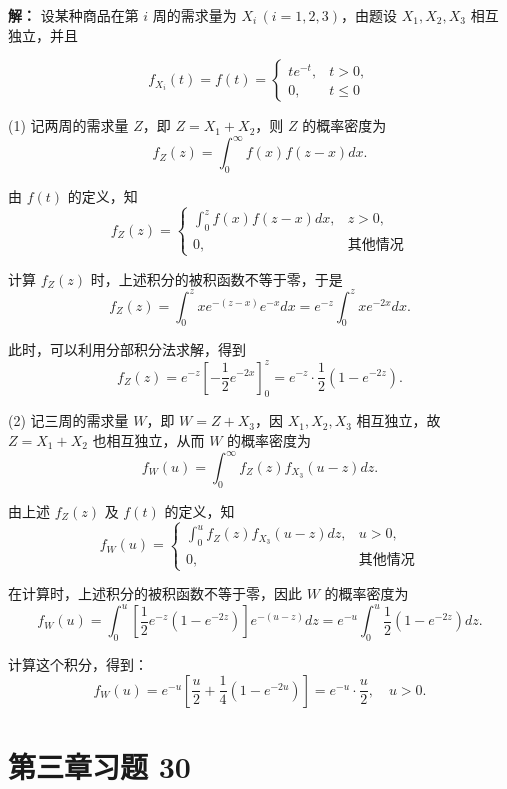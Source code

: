 \documentclass[twoside]{article}
\begin{document}
\begin{ans}{23}{23}
    \textbf{解：} 设某种商品在第 $i$ 周的需求量为 $X_i\,(i=1,2,3)$，由题设 $X_1, X_2, X_3$ 相互独立，并且

    \[
    f_{X_i}(t) = f(t) =
    \begin{cases} 
    te^{-t}, & t > 0, \\ 
    0, & t \leq 0 
    \end{cases}
    \]
    
    (1) 记两周的需求量 $Z$，即 $Z = X_1 + X_2$，则 $Z$ 的概率密度为
    \[
    f_Z(z) = \int_0^{\infty} f(x) f(z-x) dx.
    \]
    
    由 $f(t)$ 的定义，知
    \[
    f_Z(z) = 
    \begin{cases} 
    \int_0^{z} f(x) f(z-x) dx, & z > 0, \\ 
    0, & \text{其他情况} 
    \end{cases}
    \]
    
    计算 $f_Z(z)$ 时，上述积分的被积函数不等于零，于是
    \[
    f_Z(z) = \int_0^{z} xe^{-(z-x)}e^{-x} dx = e^{-z} \int_0^{z} x e^{-2x} dx.
    \]
    
    此时，可以利用分部积分法求解，得到
    \[
    f_Z(z) = e^{-z} \left[-\frac{1}{2}e^{-2x}\right]_{0}^{z} = e^{-z} \cdot \frac{1}{2}(1 - e^{-2z}).
    \]
    
    (2) 记三周的需求量 $W$，即 $W = Z + X_3$，因 $X_1, X_2, X_3$ 相互独立，故 $Z = X_1 + X_2$ 也相互独立，从而 $W$ 的概率密度为
    \[
    f_W(u) = \int_0^{\infty} f_Z(z) f_{X_3}(u - z) dz.
    \]
    
    由上述 $f_Z(z)$ 及 $f(t)$ 的定义，知
    \[
    f_W(u) = 
    \begin{cases} 
    \int_0^{u} f_Z(z) f_{X_3}(u - z) dz, & u > 0, \\ 
    0, & \text{其他情况} 
    \end{cases}
    \]
    
    在计算时，上述积分的被积函数不等于零，因此 $W$ 的概率密度为
    \[
    f_W(u) = \int_0^{u} \left[\frac{1}{2}e^{-z}(1 - e^{-2z})\right]e^{-(u-z)} dz = e^{-u} \int_0^{u} \frac{1}{2} (1 - e^{-2z}) dz.
    \]
    
    计算这个积分，得到：
    \[
    f_W(u) = e^{-u} \left[\frac{u}{2} + \frac{1}{4}(1 - e^{-2u})\right] = e^{-u} \cdot \frac{u}{2}, \quad u > 0.
    \]
\end{ans}

\section{第三章习题 30}
\end{document}
